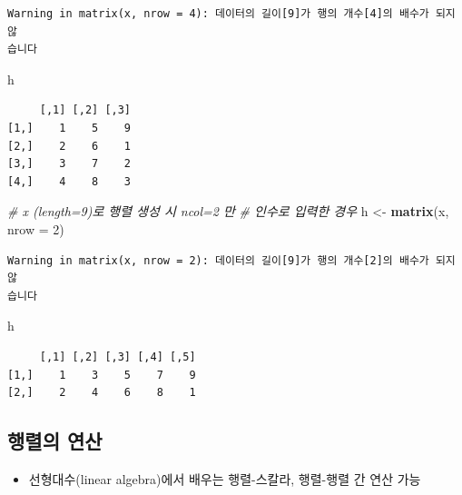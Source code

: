 \documentclass[
  11pt,
]{krantz}
\newenvironment{Shaded}{\begin{snugshade}}{\end{snugshade}}
\newcommand{\CommentTok}[1]{\textcolor[rgb]{0.37,0.37,0.37}{\textit{#1}}}
\newcommand{\DataTypeTok}[1]{\textcolor[rgb]{0.27,0.27,0.27}{#1}}
\newcommand{\DecValTok}[1]{\textcolor[rgb]{0.06,0.06,0.06}{#1}}
\newcommand{\KeywordTok}[1]{\textcolor[rgb]{0.27,0.27,0.27}{\textbf{#1}}}
\newcommand{\NormalTok}[1]{#1}
\newcommand{\StringTok}[1]{\textcolor[rgb]{0.5,0.5,0.5}{#1}}
\providecommand{\tightlist}{%
  \setlength{\itemsep}{0pt}\setlength{\parskip}{0pt}}
\begin{document}
\begin{verbatim}
Warning in matrix(x, nrow = 4): 데이터의 길이[9]가 행의 개수[4]의 배수가 되지 않
습니다
\end{verbatim}

\begin{Shaded}
\begin{Highlighting}[]
\NormalTok{h}
\end{Highlighting}
\end{Shaded}

\begin{verbatim}
     [,1] [,2] [,3]
[1,]    1    5    9
[2,]    2    6    1
[3,]    3    7    2
[4,]    4    8    3
\end{verbatim}

\begin{Shaded}
\begin{Highlighting}[]
\CommentTok{# x (length=9)로 행렬 생성 시 ncol=2 만 }
\CommentTok{# 인수로 입력한 경우}
\NormalTok{h <-}\StringTok{ }\KeywordTok{matrix}\NormalTok{(x, }\DataTypeTok{nrow =} \DecValTok{2}\NormalTok{)}
\end{Highlighting}
\end{Shaded}

\begin{verbatim}
Warning in matrix(x, nrow = 2): 데이터의 길이[9]가 행의 개수[2]의 배수가 되지 않
습니다
\end{verbatim}

\begin{Shaded}
\begin{Highlighting}[]
\NormalTok{h}
\end{Highlighting}
\end{Shaded}

\begin{verbatim}
     [,1] [,2] [,3] [,4] [,5]
[1,]    1    3    5    7    9
[2,]    2    4    6    8    1
\end{verbatim}

\normalsize

\hypertarget{matrix-operation}{%
\subsection{행렬의 연산}\label{matrix-operation}}

\begin{itemize}
\tightlist
\item
  선형대수(linear algebra)에서 배우는 행렬-스칼라, 행렬-행렬 간 연산 가능
\end{itemize}
\end{document}
